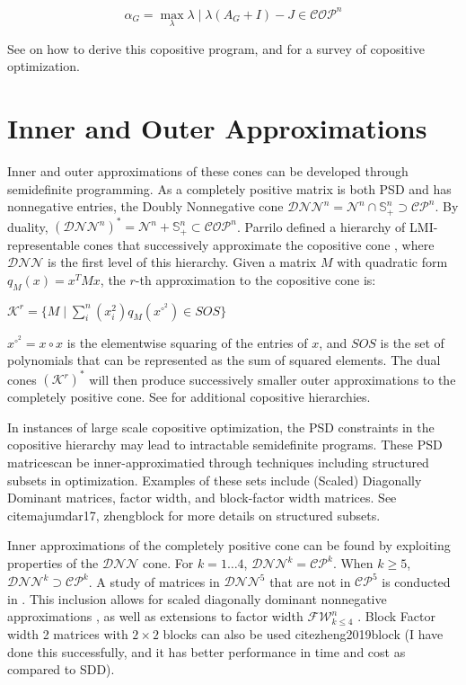 \documentclass{article}
\newcommand{\psd}{\mathbb{S}}
\newcommand{\fw}{\mathcal{F}\mathcal{W}}
\newcommand{\N}{\mathcal{N}}
\newcommand{\dnn}{\mathcal{D}\mathcal{N}\mathcal{N}}
\newcommand{\cp}{\mathcal{C}\mathcal{P}}
\newcommand{\cop}{\mathcal{C}\mathcal{O}\mathcal{P}}
\begin{document}
\[\alpha_G = \max_\lambda \lambda \mid \lambda(A_G + I) - J \in \cop^n\]

See \cite{de2002approximation} on how to derive this copositive program, and \cite{bomze2012copositive} for a survey of copositive optimization.

\section{Inner and Outer Approximations}

Inner and outer approximations of these cones can be developed through semidefinite programming. As a completely positive matrix is both PSD and has nonnegative entries, the Doubly Nonnegative cone $\dnn^n= \N^n \cap \psd_+^n \supset \cp^n$. By duality, $(\dnn^n)^* = \N^n + \psd_+^n \subset \cop^n$. Parrilo defined a hierarchy of LMI-representable cones that successively approximate the copositive cone \cite{parrilo2000structured},  where  $\dnn$ is the first level of this hierarchy. Given a matrix $M$ with quadratic form $q_M(x) = x^T M x$, the $r$-th approximation to the copositive cone is:

$\mathcal{K}^r = \{M \mid \sum_i^n(x_i^2) q_M(x^{\circ^2}) \in SOS\}$

$x^{\circ^2} = x \circ x$ is the elementwise squaring of the entries of $x$, and $SOS$ is the set of polynomials that can be represented as the sum of squared elements. The dual cones $(\mathcal{K}^r)^*$ will then produce successively smaller outer approximations to the completely positive cone. See \cite{de2002approximation, pena2007computing} for additional copositive hierarchies.

In instances of large scale copositive optimization, the PSD constraints in the copositive hierarchy may lead to intractable semidefinite programs. These PSD matricescan be inner-approximatied through techniques including structured subsets in optimization. Examples of these sets  include (Scaled) Diagonally Dominant matrices, factor width, and block-factor width matrices. See  cite{majumdar17,  zhengblock} for more details on structured subsets.


Inner approximations of the completely positive cone can be found by exploiting properties of the $\dnn$ cone. For $k = 1 \ldots 4$, $\dnn^k = \cp^k$. When $k \geq 5$, $\dnn^k \supset \cp^k$. A study of matrices in $\dnn^5$ that are not in $\cp^5$ is conducted in \cite{burer2009difference}. This inclusion allows for scaled diagonally dominant nonnegative approximations \cite{gouveia2018inner}, as well as extensions to factor width $\fw^n_{k \leq 4}$ \cite{ding2018higherorder}. Block Factor width  2 matrices with $2\times2$ blocks can also be used cite{zheng2019block} (I have done this successfully, and it has better performance in time and cost as compared to SDD).
\end{document}
